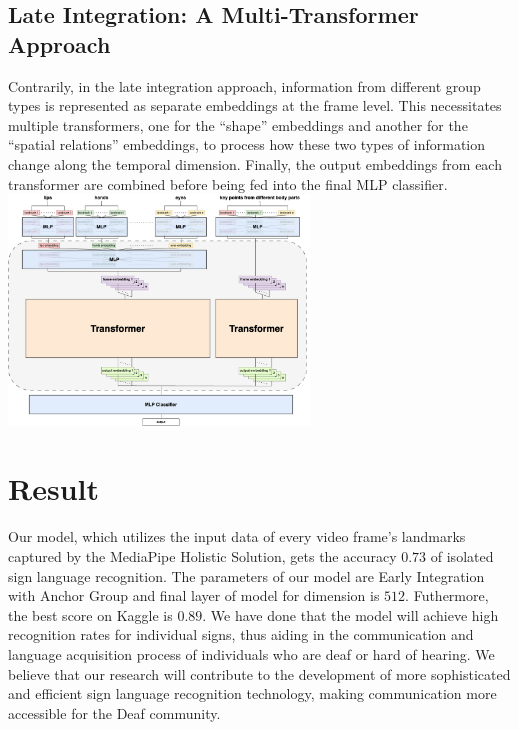 \documentclass[10pt,twocolumn,letterpaper]{article}
\begin{document}
\begin{CJK*}{UTF8}{bsmi}
\subsection{Late Integration: A Multi-Transformer Approach}
Contrarily, in the late integration approach, information from different group types is represented as separate embeddings at the frame level. This necessitates multiple transformers, one for the “shape” embeddings and another for the “spatial relations” embeddings, to process how these two types of information change along the temporal dimension. Finally, the output embeddings from each transformer are combined before being fed into the final MLP classifier.
\includegraphics[width=80mm]{late_integration.drawio}
\section{Result}
Our model, which utilizes the input data of every video frame's landmarks captured by the MediaPipe Holistic Solution, 
gets the accuracy $0.73$ of isolated sign language recognition.
The parameters of our model are Early Integration with Anchor Group and final layer of model for dimension is $512$. Futhermore, the best score on Kaggle is $0.89$.
We have done that the model will achieve high recognition rates for individual signs, 
thus aiding in the communication and language acquisition process of individuals who are deaf or hard of hearing. 
We believe that our research will contribute to the development of more sophisticated and efficient sign language recognition technology, 
making communication more accessible for the Deaf community.

{\small


}

\end{CJK*}
\end{document}
